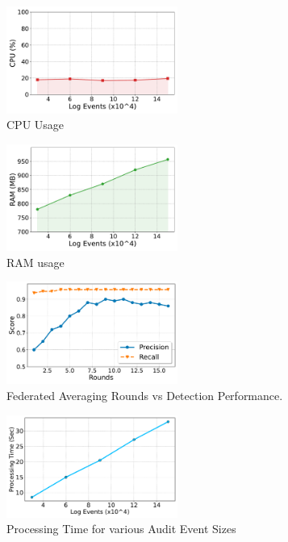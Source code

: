 \begin{figure}[t!]
  \centering
  \includegraphics[width=0.50\textwidth]{fig/cpu.pdf}
  \caption{CPU Usage}
  \label{cpu}
  \vspace{-2ex}
\end{figure}

\begin{figure}[t!]
  \centering
  \includegraphics[width=0.50\textwidth]{fig/ram.pdf}
  \caption{RAM usage}
  \label{ram}
  \vspace{-2ex}
\end{figure}

\begin{figure}[t!]
  \centering
  \includegraphics[width=0.50\textwidth]{fig/roundsvsscore.pdf}
  \caption{Federated Averaging Rounds vs Detection Performance.}
  \label{roundsvsscore}
  \vspace{-2ex}
\end{figure}

\begin{figure}[t!]
  \centering
  \includegraphics[width=0.50\textwidth]{fig/sizevstime.pdf}
  \caption{Processing Time for various Audit Event Sizes}
  \label{sizevstime}
  \vspace{-2ex}
\end{figure}

